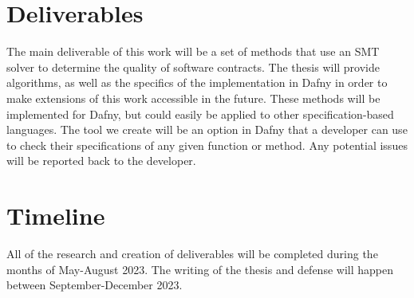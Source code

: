 \documentclass{article}
\begin{document}
\section{Deliverables}

The main deliverable of this work will be a set of methods that use an SMT solver to determine the quality of software
contracts. The thesis will provide algorithms, as well as the specifics of the implementation in Dafny in order to make
extensions of this work accessible in the future. These methods will be implemented for Dafny, but could easily be
applied to other specification-based languages. The tool we create will be an option in Dafny that a developer can
use to check their specifications of any given function or method. Any potential issues will be reported back to the
developer.

\section{Timeline}

All of the research and creation of deliverables will be completed during the months of May-August 2023. The writing of the thesis and defense will happen between September-December 2023.

% 
% 
% 

\end{document}
